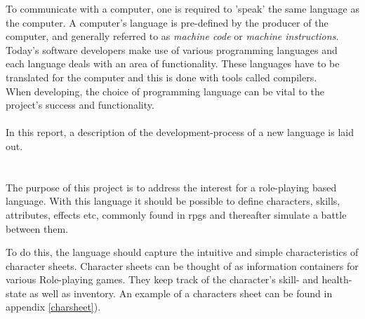 
To communicate with a computer, one is required to 'speak' the same language as the computer. A computer's language is pre-defined by the producer of the computer, and generally referred to as \emph{machine code} or \emph{machine instructions}.\\
Today's software developers make use of various programming languages and each language deals with an area of functionality. These languages have to be translated for the computer and this is done with tools called compilers.\\
When developing, the choice of programming language can be vital to the project's success and functionality.\\\\
In this report, a description of the development-process of a new language is laid out.

\section{\langname{}}
The purpose of this project is to address the interest for a role-playing based language. With this language it should be possible to define characters, skills, attributes, effects etc, commonly found in \ac{rpgs} and thereafter simulate a battle between them.

To do this, the language should capture the intuitive and simple characteristics of character sheets. Character sheets can be thought of as information containers for various Role-playing games. They keep track of the character's skill- and health-state as well as inventory. An example of a characters sheet can be found in appendix \vref{charsheet}).

